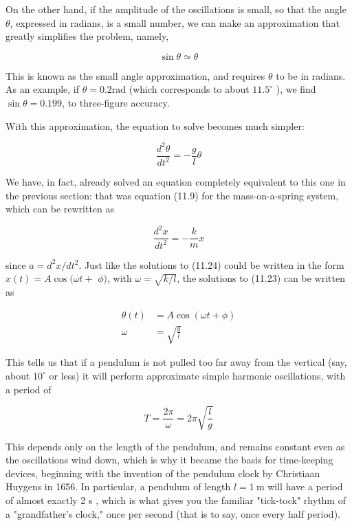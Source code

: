 \documentclass[10pt]{article}
\begin{document}
On the other hand, if the amplitude of the oscillations is small, so that the angle $\theta$, expressed in radians, is a small number, we can make an approximation that greatly simplifies the problem, namely,


\begin{equation*}
\sin \theta \simeq \theta \tag{11.22}
\end{equation*}


This is known as the small angle approximation, and requires $\theta$ to be in radians. As an example, if $\theta=0.2 \mathrm{rad}$ (which corresponds to about $11.5^{\circ}$ ), we find $\sin \theta=0.199$, to three-figure accuracy.

With this approximation, the equation to solve becomes much simpler:


\begin{equation*}
\frac{d^{2} \theta}{d t^{2}}=-\frac{g}{l} \theta \tag{11.23}
\end{equation*}


We have, in fact, already solved an equation completely equivalent to this one in the previous section: that was equation (11.9) for the mass-on-a-spring system, which can be rewritten as


\begin{equation*}
\frac{d^{2} x}{d t^{2}}=-\frac{k}{m} x \tag{11.24}
\end{equation*}


since $a=d^{2} x / d t^{2}$. Just like the solutions to (11.24) could be written in the form $x(t)=A \cos (\omega t+$ $\phi)$, with $\omega=\sqrt{k / l}$, the solutions to (11.23) can be written as


\begin{align*}
\theta(t) & =A \cos (\omega t+\phi) \\
\omega & =\sqrt{\frac{g}{l}} \tag{11.25}
\end{align*}


This tells us that if a pendulum is not pulled too far away from the vertical (say, about $10^{\circ}$ or less) it will perform approximate simple harmonic oscillations, with a period of


\begin{equation*}
T=\frac{2 \pi}{\omega}=2 \pi \sqrt{\frac{l}{g}} \tag{11.26}
\end{equation*}


This depends only on the length of the pendulum, and remains constant even as the oscillations wind down, which is why it became the basis for time-keeping devices, beginning with the invention of the pendulum clock by Christiaan Huygens in 1656. In particular, a pendulum of length $l=1 \mathrm{~m}$ will have a period of almost exactly 2 s , which is what gives you the familiar "tick-tock" rhythm of a "grandfather's clock," once per second (that is to say, once every half period).
\end{document}

